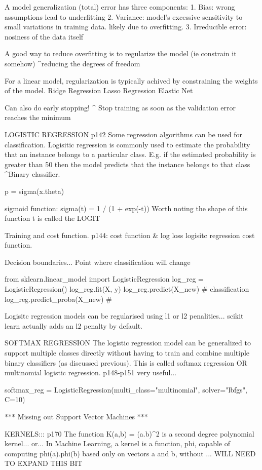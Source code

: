 A model generalization (total) error has three components:
1. Bias: wrong assumptions lead to underfitting
2. Variance: model's excessive sensitivity to small variations in training data. likely due to overfitting.
3. Irreducible error: nosiness of the data itself


A good way to reduce overfitting is to regularize the model (ie constrain it somehow)
^reducing the degrees of freedom

For a linear model, regularization is typically achived by constraining the weights of the model.
Ridge Regression
Lasso Regression
Elastic Net

Can also do early stopping!
^ Stop training as soon as the validation error reaches the minimum

LOGISTIC REGRESSION p142
Some regression algorithms can be used for classification.
Logisitic regression is commonly used to estimate the probability that
an instance belongs to a particular class.
E.g. if the estimated probability is greater than 50%
then the model predicts that the instance belongs to that class
^Binary classifier.

p = sigma(x.theta)

sigmoid function:
sigma(t) = 1 / (1 + exp(-t))
Worth noting the shape of this function
t is called the LOGIT

Training and cost function.
p144: cost function & log loss logisitc regression cost function.

Decision boundaries...
Point where classification will change

from sklearn.linear_model import LogisticRegression
log_reg = LogisticRegression()
log_reg.fit(X, y)
log_reg.predict(X_new) # classification
log_reg.predict_proba(X_new) # 

Logisitc regression models can be regularised using l1 or l2 penalities...
scikit learn actually adds an l2 penalty by default.

SOFTMAX REGRESSION
The logistic regression model can be generalized to support multiple classes directly
without having to train and combine multiple binary classifiers (as discussed previous).
This is called softmax regression OR multinomial logistic regression.
p148-p151 very useful...

softmax_reg = LogisticRegression(multi_class="multinomial", solver="lbfgs", C=10)

*** Missing out Support Vector Machines ***

KERNELS:::
p170
The function K(a,b) = (a.b)^2
is a second degree polynomial kernel...
or...
In Machine Learning,
a kernel is a function, phi,
capable of computing phi(a).phi(b)
based only on vectors a and b,
without ...
WILL NEED TO EXPAND THIS BIT

